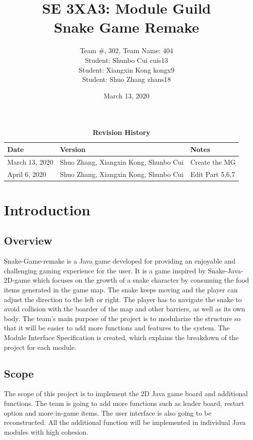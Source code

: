 \documentclass[12pt, titlepage]{article}
\title{SE 3XA3: Module Guild\\\textbf{Snake Game Remake}}
\author{Team \#, 302, Team Name: 404
		\\ Student: Shunbo Cui	    cuis13
		\\ Student: Xiangxin Kong	kongx9
		\\ Student: Shuo Zhang	    zhans18
}
\date{March 13, 2020}
\begin{document}
\maketitle

\tableofcontents
\listoftables
\listoffigures

\begin{table}[H]
\caption{\bf Revision History}
\begin{tabularx}{\textwidth}{p{3cm}p{2cm}X}
\toprule {\bf Date} & {\bf Version} & {\bf Notes}\\
\midrule
March 13, 2020 & Shuo Zhang, Xiangxin Kong, Shunbo Cui & Create the MG\\
April 6, 2020 & Shuo Zhang, Xiangxin Kong, Shunbo Cui & Edit Part 5,6,7\\
\bottomrule
\end{tabularx}
\end{table}

\newpage


\section{Introduction}

\subsection{Overview} \label{SecAchange}

Snake-Game-remake is a Java game developed for providing an enjoyable and challenging 
gaming experience for the user. It is a game inspired by Snake-Java-2D-game which 
focuses on the growth of a snake character by consuming the food items generated
in the game map. The snake keeps moving and the player can adjust the direction
to the left or right. The player has to navigate the snake to avoid collision 
with the boarder of the map and other barriers, as well as its own body. The team's
main purpose of the project is to modularize the structure so that it will be easier 
to add more functions and features to the system. The Module Interface Specification 
is created, which explains the breakdown of the project for each module.

\subsection{Scope} \label{SecAchange}

The scope of this project is to implement the 2D Java game board and additional functions.
 The team is going to add more functions such as leader board, restart option and more in-game 
 items. The user interface is also going to be reconstructed. All the additional function will 
 be implemented in individual Java modules with high cohesion.
\end{document}
